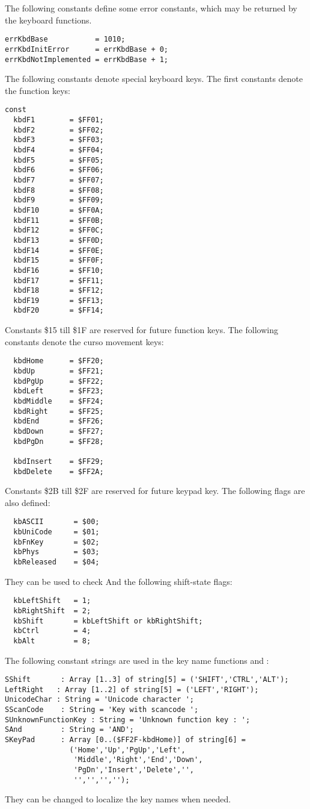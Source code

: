 The following constants define some error constants, which may be returned
by the keyboard functions.
\begin{verbatim}
errKbdBase           = 1010;
errKbdInitError      = errKbdBase + 0;
errKbdNotImplemented = errKbdBase + 1;
\end{verbatim}
The following constants denote special keyboard keys. The first constants
denote the function keys:
\begin{verbatim}
const
  kbdF1        = $FF01;
  kbdF2        = $FF02;
  kbdF3        = $FF03;
  kbdF4        = $FF04;
  kbdF5        = $FF05;
  kbdF6        = $FF06;
  kbdF7        = $FF07;
  kbdF8        = $FF08;
  kbdF9        = $FF09;
  kbdF10       = $FF0A;
  kbdF11       = $FF0B;
  kbdF12       = $FF0C;
  kbdF13       = $FF0D;
  kbdF14       = $FF0E;
  kbdF15       = $FF0F;
  kbdF16       = $FF10;
  kbdF17       = $FF11;
  kbdF18       = $FF12;
  kbdF19       = $FF13;
  kbdF20       = $FF14;
\end{verbatim}
Constants  \$15 till \$1F are reserved for future function keys. The
following constants denote the curso movement keys:
\begin{verbatim}
  kbdHome      = $FF20;
  kbdUp        = $FF21;
  kbdPgUp      = $FF22;
  kbdLeft      = $FF23;
  kbdMiddle    = $FF24;
  kbdRight     = $FF25;
  kbdEnd       = $FF26;
  kbdDown      = $FF27;
  kbdPgDn      = $FF28;

  kbdInsert    = $FF29;
  kbdDelete    = $FF2A;
\end{verbatim}
Constants \$2B till \$2F are reserved for future keypad key.
The following flags are also defined:
\begin{verbatim}
  kbASCII       = $00;
  kbUniCode     = $01;
  kbFnKey       = $02;
  kbPhys        = $03;
  kbReleased    = $04;
\end{verbatim}
They can be used to check And the following shift-state flags:
\begin{verbatim}
  kbLeftShift   = 1;
  kbRightShift  = 2;
  kbShift       = kbLeftShift or kbRightShift;
  kbCtrl        = 4;
  kbAlt         = 8;
\end{verbatim}
The following constant strings are used in the key name functions 
 and :
\begin{verbatim}
SShift       : Array [1..3] of string[5] = ('SHIFT','CTRL','ALT');
LeftRight   : Array [1..2] of string[5] = ('LEFT','RIGHT');
UnicodeChar : String = 'Unicode character ';
SScanCode    : String = 'Key with scancode ';
SUnknownFunctionKey : String = 'Unknown function key : ';
SAnd         : String = 'AND';
SKeyPad      : Array [0..($FF2F-kbdHome)] of string[6] = 
               ('Home','Up','PgUp','Left',
                'Middle','Right','End','Down',
                'PgDn','Insert','Delete','',
                '','','','');
\end{verbatim}
They can be changed to localize the key names when needed.

